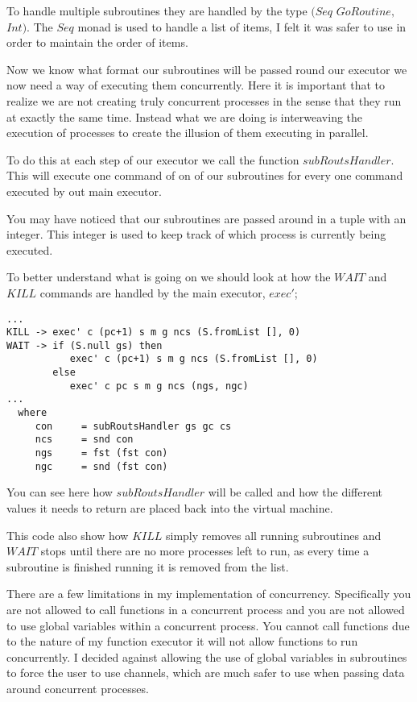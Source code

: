 To handle multiple subroutines they are handled by the type $(Seq$ $GoRoutine,$ $Int)$. The $Seq$ monad is used to handle a list of items, I felt it was safer to use in order to maintain the order of items. 

Now we know what format our subroutines will be passed round our executor we now need a way of executing them concurrently. Here it is important that to realize we are not creating truly concurrent processes in the sense that they run at exactly the same time. Instead what we are doing is interweaving the execution of processes to create the illusion of them executing in parallel. 

To do this at each step of our executor we call the function $subRoutsHandler$. This will execute one command of on of our subroutines for every one command executed by out main executor. 

You may have noticed that our subroutines are passed around in a tuple with an integer. This integer is used to keep track of which process is currently being executed. 

To better understand what is going on we should look at how the $WAIT$ and $KILL$ commands are handled by the main executor, $exec'$;

\begin{lstlisting}
...
KILL -> exec' c (pc+1) s m g ncs (S.fromList [], 0)
WAIT -> if (S.null gs) then
           exec' c (pc+1) s m g ncs (S.fromList [], 0)      
        else 
           exec' c pc s m g ncs (ngs, ngc)   
...
  where
     con     = subRoutsHandler gs gc cs
     ncs     = snd con
     ngs     = fst (fst con)
     ngc     = snd (fst con)
\end{lstlisting}    
 

You can see here how $subRoutsHandler$ will be called and how the different values it needs to return are placed back into the virtual machine. 

This code also show how $KILL$ simply removes all running subroutines and $WAIT$ stops until there are no more processes left to run, as every time a subroutine is finished running it is removed from the list.

There are a few limitations in my implementation of concurrency. Specifically you are  not allowed to call functions in a concurrent process and you are not allowed to use global variables within a concurrent process. You cannot call functions due to the nature of my function executor it will not allow functions to run concurrently. I decided against allowing the use of global variables in subroutines to force the user to use channels, which are much safer to use when passing data around concurrent processes.

